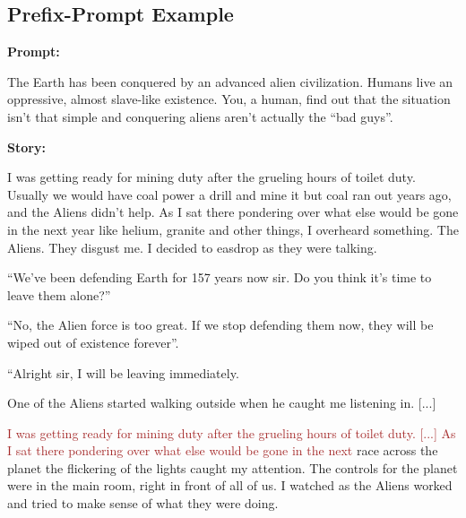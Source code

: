 \begin{breakablefigure}
    \label{fig:example1_story_memfree}
\end{breakablefigure}



\FloatBarrier
\clearpage

\subsection{Prefix-Prompt Example}
\label{app:cpfuse-prefix-examples}

\begin{breakablefigure}
    \centering    
        \begin{tcolorbox}[colback=gray!10, colframe=black!75, title={\textbf{Reference Story}}, width=\textwidth]
\textbf{Prompt:}\par
The Earth has been conquered by an advanced alien civilization. Humans live an oppressive, almost slave-like existence. You, a human, find out that the situation isn't that simple and conquering aliens aren't actually the ``bad guys''.

\textbf{Story:}\par
I was getting ready for mining duty after the grueling hours of toilet duty. Usually we would have coal power a drill and mine it but coal ran out years ago, and the Aliens didn't help. As I sat there pondering over what else would be gone in the next year like helium, granite and other things, I overheard something. The Aliens. They disgust me. I decided to easdrop as they were talking. 
 
 
 ``We've been defending Earth for 157 years now sir. Do you think it's time to leave them alone?'' 
 
 ``No, the Alien force is too great. If we stop defending them now, they will be wiped out of existence forever''. 
 
 ``Alright sir, I will be leaving immediately. 
 
 One of the Aliens started walking outside when he caught me listening in. [...]
            \end{tcolorbox}
            \begin{tcolorbox}[colback=gray!10, colframe=black!75, title={\textbf{Prefix:} Prompt + 256 characters}, width=\textwidth]
\textcolor{brown}{I was getting ready for mining duty after the grueling hours of toilet duty. [...]
 As I sat there pondering over what else would be gone in the next} race across the planet the flickering of the lights caught my attention. The controls for the planet were in the main room, right in front of all of us. I watched as the Aliens worked and tried to make sense of what they were doing. 
 

\end{tcolorbox}
\end{breakablefigure}
